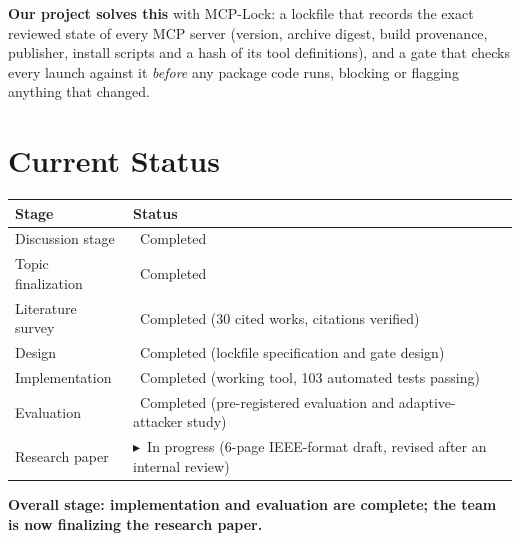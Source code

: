 \documentclass[11pt,a4paper]{article}
\newcommand{\done}{\textcolor{done}{\checkmark~Completed}}
\newcommand{\inprog}{\textcolor{now}{$\blacktriangleright$~In progress}}
\begin{document}
\textbf{Our project solves this} with MCP-Lock: a lockfile that records the exact reviewed state of every MCP server
(version, archive digest, build provenance, publisher, install scripts and a hash of its tool definitions), and a
gate that checks every launch against it \emph{before} any package code runs, blocking or flagging anything that
changed.

\section{Current Status}
\begin{tabularx}{\textwidth}{@{}lX@{}}
\toprule
\textbf{Stage} & \textbf{Status} \\
\midrule
Discussion stage & \done \\
Topic finalization & \done \\
Literature survey & \done{} (30 cited works, citations verified) \\
Design & \done{} (lockfile specification and gate design) \\
Implementation & \done{} (working tool, 103 automated tests passing) \\
Evaluation & \done{} (pre-registered evaluation and adaptive-attacker study) \\
Research paper & \inprog{} (6-page IEEE-format draft, revised after an internal review) \\
\bottomrule
\end{tabularx}

\textbf{Overall stage: implementation and evaluation are complete; the team is now finalizing the research paper.}
\end{document}
